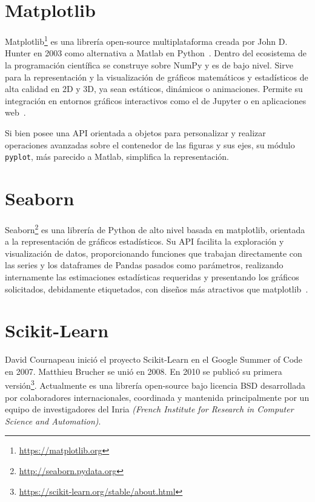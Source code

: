 \documentclass[a4paper, 12pt]{book}
\begin{document}
\section{Matplotlib} 
\label{sec:matplotlib}

Matplotlib\footnote{\url{https://matplotlib.org}} es una librería open-source multiplataforma creada por John D. Hunter en 2003 como alternativa a Matlab en Python~\cite{Hunter2007}. Dentro del ecosistema de la programación científica se construye sobre NumPy y es de bajo nivel.
Sirve para la representación y la visualización de gráficos matemáticos y estadísticos de alta calidad en 2D y 3D, ya sean estáticos, dinámicos o animaciones. Permite su integración en entornos gráficos interactivos como el de Jupyter o en aplicaciones web~\cite{VanderplasJake2017Pdsh}.

Si bien posee una API orientada a objetos para personalizar y realizar operaciones avanzadas sobre el contenedor de las figuras y sus ejes, su módulo \texttt{pyplot}, más parecido a Matlab, simplifica la representación. 

\section{Seaborn} 
\label{sec:seaborn}

Seaborn\footnote{\url{http://seaborn.pydata.org}} es una librería de Python de alto nivel basada en matplotlib, orientada a la representación de gráficos estadísticos. Su API facilita la exploración y visualización de datos, proporcionando funciones que trabajan directamente con las series y los dataframes de Pandas pasados como parámetros, realizando internamente las estimaciones estadísticas requeridas y presentando los gráficos solicitados, debidamente etiquetados, con diseños más atractivos que matplotlib~\cite{waskom2021seaborn}.

\section{Scikit-Learn} 
\label{sec:sklearn}

David Cournapeau inició el proyecto Scikit-Learn en el Google Summer of Code en 2007. Matthieu Brucher se unió en 2008. En 2010 se publicó su primera versión\footnote{\url{https://scikit-learn.org/stable/about.html}}. Actualmente es una librería open-source bajo licencia BSD desarrollada por colaboradores internacionales, coordinada y mantenida principalmente por un equipo de investigadores del Inria \emph{(French Institute for Research in Computer Science and Automation)}.
\end{document}
